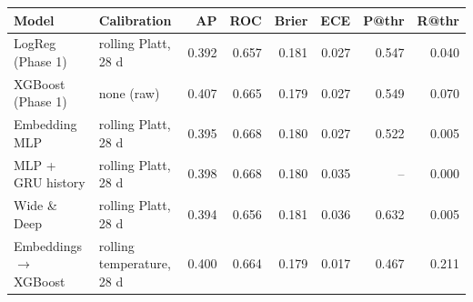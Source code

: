 \begin{tabular}{llrrrrrr}
\toprule
Model & Calibration & AP & ROC & Brier & ECE & P@thr & R@thr \\
\midrule
LogReg (Phase 1) & rolling Platt, 28 d & 0.392 & 0.657 & 0.181 & 0.027 & 0.547 & 0.040 \\
XGBoost (Phase 1) & none (raw) & 0.407 & 0.665 & 0.179 & 0.027 & 0.549 & 0.070 \\
Embedding MLP & rolling Platt, 28 d & 0.395 & 0.668 & 0.180 & 0.027 & 0.522 & 0.005 \\
MLP + GRU history & rolling Platt, 28 d & 0.398 & 0.668 & 0.180 & 0.035 & -- & 0.000 \\
Wide \& Deep & rolling Platt, 28 d & 0.394 & 0.656 & 0.181 & 0.036 & 0.632 & 0.005 \\
Embeddings $\rightarrow$ XGBoost & rolling temperature, 28 d & 0.400 & 0.664 & 0.179 & 0.017 & 0.467 & 0.211 \\
\bottomrule
\end{tabular}
